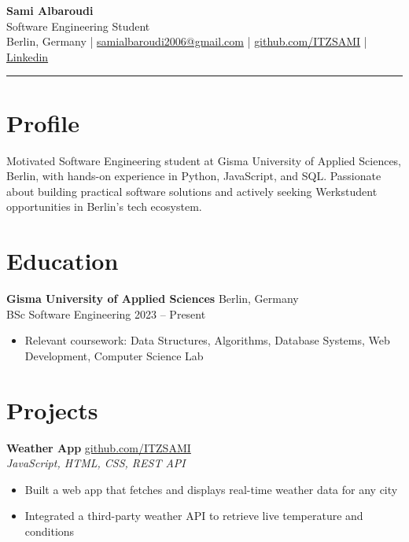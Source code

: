\documentclass[a4paper,10pt]{article}
\begin{document}
\begin{center}
    {\Huge \textbf{Sami Albaroudi}} \\[0.4em]
    {\large Software Engineering Student} \\[0.3em]
    \small Berlin, Germany \quad | \quad
    \href{mailto:your@email.com}{samialbaroudi2006@gmail.com} \quad | \quad
    \href{https://github.com/ITZSAMI}{github.com/ITZSAMI} \quad | \quad
    \href{https://www.linkedin.com/in/sami-albaroudi-304830295/}{Linkedin}
\end{center}

\vspace{0.5em}
\noindent\rule{\linewidth}{0.4pt}
\vspace{0.5em}

\section{Profile}
Motivated Software Engineering student at Gisma University of Applied Sciences, Berlin, with hands-on experience in Python, JavaScript, and SQL. Passionate about building practical software solutions and actively seeking Werkstudent opportunities in Berlin's tech ecosystem.

\section{Education}
\textbf{Gisma University of Applied Sciences} \hfill Berlin, Germany \\
BSc Software Engineering \hfill 2023 -- Present \\
\begin{itemize}[leftmargin=*, noitemsep, topsep=4pt]
    \item Relevant coursework: Data Structures, Algorithms, Database Systems, Web Development, Computer Science Lab
\end{itemize}

\section{Projects}

\textbf{Weather App} \hfill \href{https://github.com/ITZSAMI}{github.com/ITZSAMI} \\
\textit{JavaScript, HTML, CSS, REST API} \\
\begin{itemize}[leftmargin=*, noitemsep, topsep=4pt]
    \item Built a web app that fetches and displays real-time weather data for any city
    \item Integrated a third-party weather API to retrieve live temperature and conditions
\end{itemize}
\end{document}

